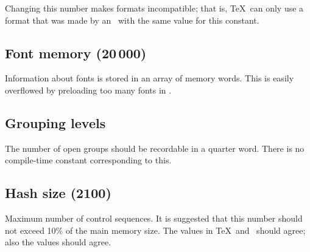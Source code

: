 Changing this  number makes formats incompatible;
that is, \TeX\ can only use a format that was made by
an \IniTeX\ with the same value for this constant.

\subsection{Font memory (20$\,$000)}

Information about fonts is stored in an array of
memory words. This is easily overflowed by preloading too
many fonts in \IniTeX.

\subsection{Grouping levels}

The number of open groups  should be recordable 
in a quarter word. There is no compile-time constant corresponding
to this.

\subsection{Hash size {\rm(2100)}}

Maximum number of control sequences. It is suggested that
this number should not exceed 10\% of the main memory size.
The values in \TeX\ and \IniTeX\ should agree; also the
 values should agree.

